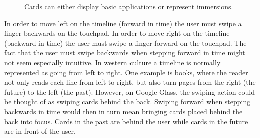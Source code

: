 	\begin{figure}[ht!]
		\centering
  	 \qquad
   	\qquad
   	\qquad
		\caption{Cards can either display basic applications or represent immersions.}
		\label{GoogleGlassCards}
	\end{figure}

In order to move left on the timeline (forward in time) the user must swipe a finger backwards on the touchpad. In order to move right on the timeline (backward in time) the user must swipe a finger forward on the touchpad. The fact that the user must swipe backwards when stepping forward in time might not seem especially intuitive. In western culture a timeline is normally represented as going from left to right. One example is books, where the reader not only reads each line from left to right, but also turn pages from the right (the future) to the left (the past). However, on Google Glass, the swiping action could be thought of as swiping cards behind the back. Swiping forward when stepping backwards in time would then in turn mean bringing cards placed behind the back into focus. Cards in the past are behind the user while cards in the future are in front of the user.


